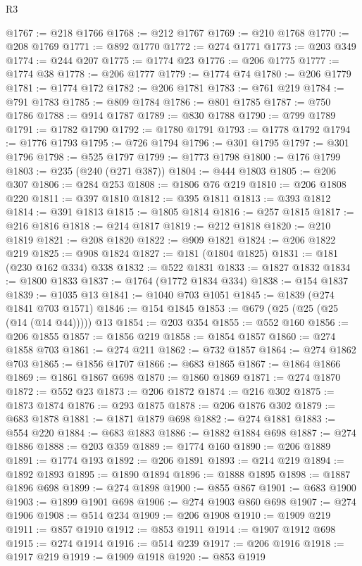 \begin{lexlean}{R3}
\begin{coremodule}
@1767 := @218 @1766
@1768 := @212 @1767
@1769 := @210 @1768
@1770 := @208 @1769
@1771 := @892 @1770
@1772 := @274 @1771
@1773 := @203 @349
@1774 := @244 @207
@1775 := @1774 @23
@1776 := @206 @1775
@1777 := @1774 @38
@1778 := @206 @1777
@1779 := @1774 @74
@1780 := @206 @1779
@1781 := @1774 @172
@1782 := @206 @1781
@1783 := @761 @219
@1784 := @791 @1783
@1785 := @809 @1784
@1786 := @801 @1785
@1787 := @750 @1786
@1788 := @914 @1787
@1789 := @830 @1788
@1790 := @799 @1789
@1791 := @1782 @1790
@1792 := @1780 @1791
@1793 := @1778 @1792
@1794 := @1776 @1793
@1795 := @726 @1794
@1796 := @301 @1795
@1797 := @301 @1796
@1798 := @525 @1797
@1799 := @1773 @1798
@1800 := @176 @1799
@1803 := @235 (@240 (@271 @387))
@1804 := @444 @1803
@1805 := @206 @307
@1806 := @284 @253
@1808 := @1806 @76 @219
@1810 := @206 @1808 @220
@1811 := @397 @1810
@1812 := @395 @1811
@1813 := @393 @1812
@1814 := @391 @1813
@1815 := @1805 @1814
@1816 := @257 @1815
@1817 := @216 @1816
@1818 := @214 @1817
@1819 := @212 @1818
@1820 := @210 @1819
@1821 := @208 @1820
@1822 := @909 @1821
@1824 := @206 @1822 @219
@1825 := @908 @1824
@1827 := @181 (@1804 @1825)
@1831 := @181 (@230 @162 @334) @338
@1832 := @522 @1831
@1833 := @1827 @1832
@1834 := @1800 @1833
@1837 := @1764 (@1772 @1834 @334)
@1838 := @154 @1837
@1839 := @1035 @13
@1841 := @1040 @703 @1051
@1845 := @1839 (@274 @1841 @703 @1571)
@1846 := @154 @1845
@1853 := @679 (@25 (@25 (@25 (@14 (@14 @44))))) @13
@1854 := @203 @354
@1855 := @552 @160
@1856 := @206 @1855
@1857 := @1856 @219
@1858 := @1854 @1857
@1860 := @274 @1858 @703
@1861 := @274 @211
@1862 := @732 @1857
@1864 := @274 @1862 @703
@1865 := @1856 @1707
@1866 := @683 @1865
@1867 := @1864 @1866
@1869 := @1861 @1867 @698
@1870 := @1860 @1869
@1871 := @274 @1870
@1872 := @552 @23
@1873 := @206 @1872
@1874 := @216 @302
@1875 := @1873 @1874
@1876 := @293 @1875
@1878 := @206 @1876 @302
@1879 := @683 @1878
@1881 := @1871 @1879 @698
@1882 := @274 @1881
@1883 := @554 @220
@1884 := @683 @1883
@1886 := @1882 @1884 @698
@1887 := @274 @1886
@1888 := @203 @359
@1889 := @1774 @160
@1890 := @206 @1889
@1891 := @1774 @193
@1892 := @206 @1891
@1893 := @214 @219
@1894 := @1892 @1893
@1895 := @1890 @1894
@1896 := @1888 @1895
@1898 := @1887 @1896 @698
@1899 := @274 @1898
@1900 := @855 @867
@1901 := @683 @1900
@1903 := @1899 @1901 @698
@1906 := @274 @1903 @860 @698
@1907 := @274 @1906
@1908 := @514 @234
@1909 := @206 @1908
@1910 := @1909 @219
@1911 := @857 @1910
@1912 := @853 @1911
@1914 := @1907 @1912 @698
@1915 := @274 @1914
@1916 := @514 @239
@1917 := @206 @1916
@1918 := @1917 @219
@1919 := @1909 @1918
@1920 := @853 @1919

\end{coremodule}
\end{lexlean}

